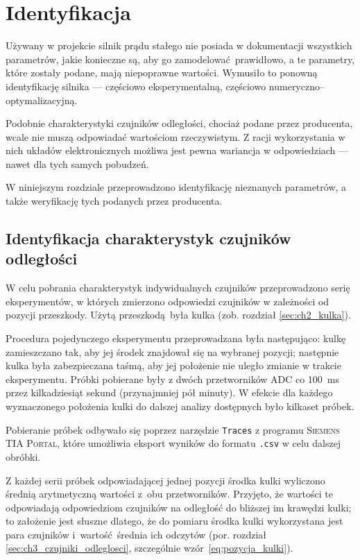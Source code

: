 \chapter{Identyfikacja}
\label{cha:ch5_identyfikacja}

Używany w projekcie silnik prądu stałego nie posiada w dokumentacji wszystkich parametrów, jakie konieczne są, aby go zamodelować prawidłowo, a te parametry, które zostały podane, mają niepoprawne wartości. Wymusiło to ponowną identyfikację silnika --- częściowo eksperymentalną, częściowo numeryczno--optymalizacyjną.

Podobnie charakterystyki czujników odległości, chociaż podane przez producenta, wcale nie muszą odpowiadać wartościom rzeczywistym. Z racji wykorzystania w nich układów elektronicznych możliwa jest pewna wariancja w odpowiedziach --- nawet dla tych samych pobudzeń.

W niniejszym rozdziale przeprowadzono identyfikację nieznanych parametrów, a także weryfikację tych podanych przez producenta.

\section{Identyfikacja charakterystyk czujników odległości}
\label{sec:ch5_identyfikacja_charakterystyk_czujnikow}

W celu pobrania charakterystyk indywidualnych czujników przeprowadzono serię eksperymentów, w których zmierzono odpowiedzi czujników w zależności od pozycji przeszkody. Użytą przeszkodą była kulka (zob. rozdział \ref{sec:ch2_kulka}).

Procedura pojedynczego eksperymentu przeprowadzana była następująco: kulkę zamieszczano tak, aby jej środek znajdował się na wybranej pozycji; następnie kulka była zabezpieczana taśmą, aby jej położenie nie uległo zmianie w trakcie eksperymentu. Próbki pobierane były z dwóch przetworników ADC co \SI{100}{\milli\second} przez kilkadziesiąt sekund (przynajmniej pół minuty). W efekcie dla każdego wyznaczonego położenia kulki do dalszej analizy dostępnych było kilkaset próbek.

Pobieranie próbek odbywało się poprzez narzędzie \texttt{Traces} z programu \textsc{Siemens TIA Portal}, które umożliwia eksport wyników do formatu \texttt{.csv} w celu dalszej obróbki.

Z każdej serii próbek odpowiadającej jednej pozycji środka kulki wyliczono średnią arytmetyczną wartości z~obu przetworników. Przyjęto, że wartości te odpowiadają odpowiedziom czujników na odległość do bliższej im krawędzi kulki; to założenie jest słuszne dlatego, że do pomiaru środka kulki wykorzystana jest para czujników i~wartość średnia ich odczytów (por. rozdział \ref{sec:ch3_czujniki_odleglosci}, szczególnie wzór~\eqref{eq:pozycja_kulki}).

